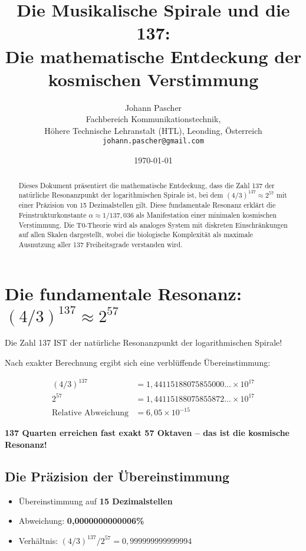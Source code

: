 \documentclass[12pt,a4paper]{article}
\title{Die Musikalische Spirale und die 137:\\
	Die mathematische Entdeckung der kosmischen Verstimmung}
\author{Johann Pascher\\
	Fachbereich Kommunikationstechnik,\\
	Höhere Technische Lehranstalt (HTL), Leonding, Österreich\\
	\texttt{johann.pascher@gmail.com}}
\date{\today}
\begin{document}
	
	\maketitle
	
	\begin{abstract}
		Dieses Dokument präsentiert die mathematische Entdeckung, dass die Zahl 137 der natürliche Resonanzpunkt der logarithmischen Spirale ist, bei dem $(4/3)^{137} \approx 2^{57}$ mit einer Präzision von 15 Dezimalstellen gilt. Diese fundamentale Resonanz erklärt die Feinstrukturkonstante $\alpha \approx 1/137{,}036$ als Manifestation einer minimalen kosmischen Verstimmung. Die T0-Theorie wird als analoges System mit diskreten Einschränkungen auf allen Skalen dargestellt, wobei die biologische Komplexität als maximale Ausnutzung aller 137 Freiheitsgrade verstanden wird.
	\end{abstract}
	
	\tableofcontents
	\newpage
	
	\section{Die fundamentale Resonanz: $(4/3)^{137} \approx 2^{57}$}
	
	Die Zahl 137 IST der natürliche Resonanzpunkt der logarithmischen Spirale!
	
	Nach exakter Berechnung ergibt sich eine verblüffende Übereinstimmung:
	
	\begin{align}
		(4/3)^{137} &= 1{,}44115188075855000... \times 10^{17}\\
		2^{57} &= 1{,}44115188075855872... \times 10^{17}\\
		\text{Relative Abweichung} &= 6{,}05 \times 10^{-15}
	\end{align}
	
	\textbf{137 Quarten erreichen fast exakt 57 Oktaven -- das ist die kosmische Resonanz!}
	
	\subsection{Die Präzision der Übereinstimmung}
	
	\begin{itemize}
		\item Übereinstimmung auf \textbf{15 Dezimalstellen}
		\item Abweichung: \textbf{0{,}0000000000006\%}
		\item Verhältnis: $(4/3)^{137} / 2^{57} = 0{,}999999999999994$
	\end{itemize}
	
\end{document}
